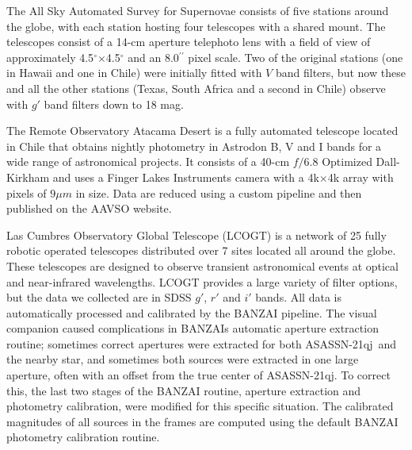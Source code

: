 \documentclass[sn-nature]{sn-jnl}%
\newcommand*\degr{\ensuremath{^\circ}}
\newcommand*\arcsec{\ensuremath{^{\prime\prime}}}
\newcommand{\asas}{ASASSN-21qj}
\begin{document}

The All Sky Automated Survey for Supernovae \cite[ASAS-SN; ][]{shappee_man_2014,kochanek_all-sky_2017} consists of five stations around the globe, with each station hosting four telescopes with a shared mount.
%
The telescopes consist of a 14-cm aperture telephoto lens with a field of view of approximately 4.5\degr{}$\times$4.5\degr{} and an 8.0\arcsec{} pixel scale.
% 
Two of the original stations (one in Hawaii and one in Chile) were initially fitted with $V$ band filters, but now these and all the other stations (Texas, South Africa and a second in Chile) observe with $g'$ band filters down to 18 mag.



The Remote Observatory Atacama Desert \cite[ROAD; ][]{Hambsch12} is a fully automated telescope located in Chile that obtains nightly photometry in Astrodon B, V and I bands for a wide range of astronomical projects.
%
It consists of a 40-cm $f/6.8$ Optimized Dall-Kirkham and uses a Finger Lakes Instruments camera with a 4k$\times$4k array with pixels of $9\mu m$ in size.
%
Data are reduced using a custom pipeline and then published on the AAVSO website.


Las Cumbres Observatory Global Telescope (LCOGT) is a network of 25 fully robotic operated telescopes distributed over 7 sites located all around the globe.
%
These telescopes are designed to observe transient astronomical events at optical and near-infrared wavelengths.
%
LCOGT provides a large variety of filter options, but the data we collected are in SDSS $g'$, $r'$ and $i'$ bands.
%
All data is automatically processed and calibrated by the BANZAI pipeline.
%
The visual companion caused complications in BANZAIs automatic aperture extraction routine; sometimes correct apertures were extracted for both \asas\ and the nearby star, and sometimes both sources were extracted in one large aperture, often with an offset from the true center of \asas.
%
%
To correct this, the last two stages of the BANZAI routine, aperture extraction and photometry calibration, were modified for this specific situation. 
%
The calibrated magnitudes of all sources in the frames are computed using the default BANZAI photometry calibration routine.
\end{document}
